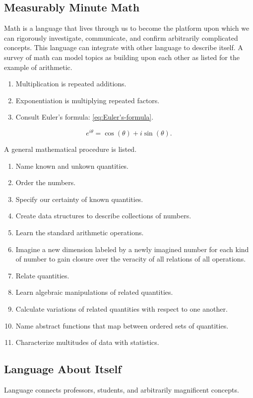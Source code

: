 \documentclass{book}
\begin{document}
\subsection{Measurably Minute Math}
Math is a language that lives through us to become the platform upon which we can rigorously investigate, communicate, and confirm arbitrarily complicated concepts.
This language can integrate with other language to describe itself.
A survey of math can model topics as building upon each other as listed for the example of arithmetic.

\begin{enumerate}
	\item Multiplication is repeated additions.
	\item Exponentiation is multiplying repeated factors.
	\item Consult Euler's formula: \ref{eq:Euler's-formula}.
\end{enumerate}

\begin{equation}e^{i\theta}=\cos(\theta)+i\sin(\theta).\label{eq:Euler's-formula}\end{equation}

A general mathematical procedure is listed.

\begin{enumerate}
	\item Name known and unkown quantities.
	\item Order the numbers.
	\item Specify our certainty of known quantities.
	\item Create data structures to describe collections of numbers.
	\item Learn the standard arithmetic operations.
	\item Imagine a new dimension labeled by a newly imagined number for each kind of number to gain closure over the veracity of all relations of all operations.
	\item Relate quantities.
	\item Learn algebraic manipulations of related quantities.
	\item Calculate variations of related quantities with respect to one another.
	\item Name abstract functions that map between ordered sets of quantities.
	\item Characterize multitudes of data with statistics.
\end{enumerate}

\subsection{Language About Itself}
Language connects professors, students, and arbitrarily magnificent concepts.
\end{document}
